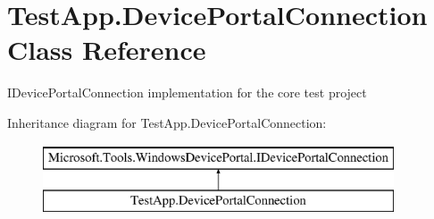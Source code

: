 \hypertarget{class_test_app_1_1_device_portal_connection}{}\section{Test\+App.\+Device\+Portal\+Connection Class Reference}
\label{class_test_app_1_1_device_portal_connection}


I\+Device\+Portal\+Connection implementation for the core test project  


Inheritance diagram for Test\+App.\+Device\+Portal\+Connection\+:\begin{figure}[H]
\begin{center}
\leavevmode
\includegraphics[height=2.000000cm]{class_test_app_1_1_device_portal_connection}
\end{center}
\end{figure}
